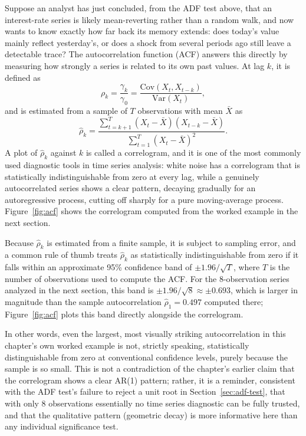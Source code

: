 \documentclass[../ai_in_finance]{subfiles}
\begin{document}
Suppose an analyst has just concluded, from the ADF test above, that an interest-rate series is likely mean-reverting rather than a random walk, and now wants to know exactly how far back its memory extends: does today's value mainly reflect yesterday's, or does a shock from several periods ago still leave a detectable trace? The autocorrelation function (ACF) answers this directly by measuring how strongly a series is related to its own past values. At lag $k$, it is defined as
\begin{equation*}
\rho_k = \frac{\gamma_k}{\gamma_0} = \frac{\text{Cov}(X_t, X_{t-k})}{\text{Var}(X_t)},
\end{equation*}
and is estimated from a sample of $T$ observations with mean $\bar X$ as
\begin{equation*}
\hat\rho_k = \frac{\sum_{t=k+1}^{T} (X_t - \bar X)(X_{t-k} - \bar X)}{\sum_{t=1}^{T} (X_t - \bar X)^2}.
\end{equation*}
A plot of $\hat\rho_k$ against $k$ is called a correlogram, and it is one of the most commonly used diagnostic tools in time series analysis: white noise has a correlogram that is statistically indistinguishable from zero at every lag, while a genuinely autocorrelated series shows a clear pattern, decaying gradually for an autoregressive process, cutting off sharply for a pure moving-average process. Figure~\ref{fig:acf} shows the correlogram computed from the worked example in the next section.

Because $\hat\rho_k$ is estimated from a finite sample, it is subject to sampling error, and a common rule of thumb treats $\hat\rho_k$ as statistically indistinguishable from zero if it falls within an approximate 95\% confidence band of $\pm 1.96/\sqrt{T}$, where $T$ is the number of observations used to compute the ACF. For the 8-observation series analyzed in the next section, this band is $\pm 1.96/\sqrt{8} \approx \pm 0.693$, which is larger in magnitude than the sample autocorrelation $\hat\rho_1 = 0.497$ computed there; Figure~\ref{fig:acf} plots this band directly alongside the correlogram.

In other words, even the largest, most visually striking autocorrelation in this chapter's own worked example is not, strictly speaking, statistically distinguishable from zero at conventional confidence levels, purely because the sample is so small. This is not a contradiction of the chapter's earlier claim that the correlogram shows a clear AR(1) pattern; rather, it is a reminder, consistent with the ADF test's failure to reject a unit root in Section~\ref{sec:adf-test}, that with only 8 observations essentially no time series diagnostic can be fully trusted, and that the qualitative pattern (geometric decay) is more informative here than any individual significance test.
\end{document}
